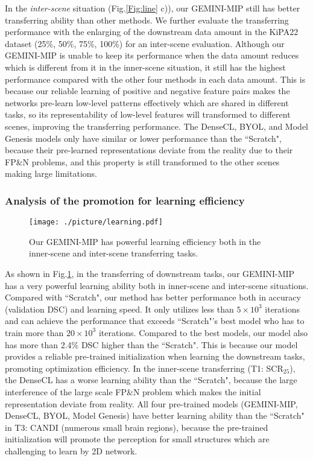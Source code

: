 In the \emph{inter-scene} situation (Fig.\ref{Fig:line} c)), our GEMINI-MIP still has better transferring ability than other methods. We further evaluate the transferring performance with the enlarging of the downstream data amount in the KiPA22 dataset (25\%, 50\%, 75\%, 100\%) for an inter-scene evaluation. Although our GEMINI-MIP is unable to keep its performance when the data amount reduces which is different from it in the inner-scene situation, it still has the highest performance compared with the other four methods in each data amount. This is because our reliable learning of positive and negative feature pairs makes the networks pre-learn low-level patterns effectively which are shared in different tasks, so its representability of low-level features will transformed to different scenes, improving the transferring performance. The DenseCL, BYOL, and Model Genesis models only have similar or lower performance than the ``Scratch", because their pre-learned representations deviate from the reality due to their FP\&N problems, and this property is still transformed to the other scenes making large limitations.

\subsubsection{Analysis of the promotion for learning efficiency}
\begin{figure}
  \centering
  \texttt{[image: ./picture/learning.pdf]}
  \caption{Our GEMINI-MIP has powerful learning efficiency both in the inner-scene and inter-scene transferring tasks.}\label{Fig:learning}
\end{figure}
As shown in Fig.\ref{Fig:learning}, in the transferring of downstream tasks, our GEMINI-MIP has a very powerful learning ability both in inner-scene and inter-scene situations. Compared with ``Scratch", our method has better performance both in accuracy (validation DSC) and learning speed. It only utilizes less than $5\times10^{3}$ iterations and can achieve the performance that exceeds ``Scratch"'s best model who has to train more than $20\times10^3$ iterations. Compared to the best models, our model also has more than 2.4\% DSC higher than the ``Scratch". This is because our model provides a reliable pre-trained initialization when learning the downstream tasks, promoting optimization efficiency. In the inner-scene transferring (T1: SCR$_{25}$), the DenseCL has a worse learning ability than the ``Scratch", because the large interference of the large scale FP\&N problem which makes the initial representation deviate from reality. All four pre-trained models (GEMINI-MIP, DenseCL, BYOL, Model Genesis) have better learning ability than the ``Scratch" in T3: CANDI (numerous small brain regions), because the pre-trained initialization will promote the perception for small structures which are challenging to learn by 2D network.
